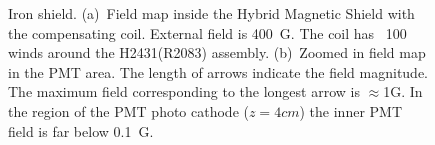 \documentclass[12pt]{article}
\begin{document}
\begin{figure}[ht]%
\centering
{}
\qquad
{}
\caption{\small{Iron shield. 
(a)~Field map inside the Hybrid Magnetic Shield 
with the compensating coil. External field is 400~G.
The coil has ~100 winds around  the H2431(R2083) assembly.
(b)~Zoomed in field map in the PMT area.
The length of arrows indicate the  field magnitude. 
The maximum field corresponding to the longest arrow  is $\approx$1G.
In the region of the  PMT photo cathode ($z=4cm$)  the inner PMT field is far below 0.1~G.}
\label{VBT3CYUS2}}
\end{figure}
\end{document}
